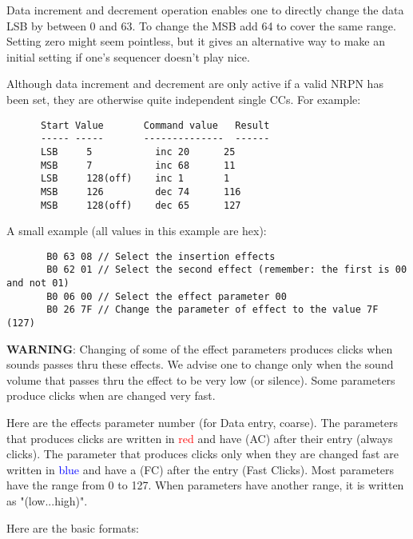    Data increment and decrement operation enables one to directly change the
   data LSB by between 0 and 63. To change the MSB add 64 to cover the same
   range. Setting zero might seem pointless, but it gives an alternative way
   to make an initial setting if one's sequencer doesn't play nice.

   Although data increment and decrement are only active if a valid NRPN has
   been set, they are otherwise quite independent single CCs.  For example:

   \begin{verbatim}
      Start Value       Command value   Result
      ----- -----       --------------  ------
      LSB     5           inc 20      25
      MSB     7           inc 68      11
      LSB     128(off)    inc 1       1
      MSB     126         dec 74      116
      MSB     128(off)    dec 65      127
   \end{verbatim}

   A small example (all values in this example are hex):

   \begin{verbatim}
       B0 63 08 // Select the insertion effects
       B0 62 01 // Select the second effect (remember: the first is 00 and not 01)
       B0 06 00 // Select the effect parameter 00
       B0 26 7F // Change the parameter of effect to the value 7F (127)
   \end{verbatim}

   \textbf{WARNING}:
   Changing of some of the effect parameters produces clicks when sounds
   passes thru these effects.  We advise one to change only when the sound
   volume that passes thru the effect to be very low (or silence).  Some
   parameters produce clicks when are changed very fast.

   Here are the effects parameter number (for Data entry, coarse).
   The parameters that produces clicks are written in \textcolor{red}{red}
   and have (AC) after their entry (always clicks).
   The parameter that produces clicks only when they are changed fast are
   written in \textcolor{blue}{blue} and have a (FC) after the entry (Fast
   Clicks).
   Most parameters have the range from 0 to 127.
   When parameters have another range, it is written as "(low...high)".

   Here are the basic formats:

